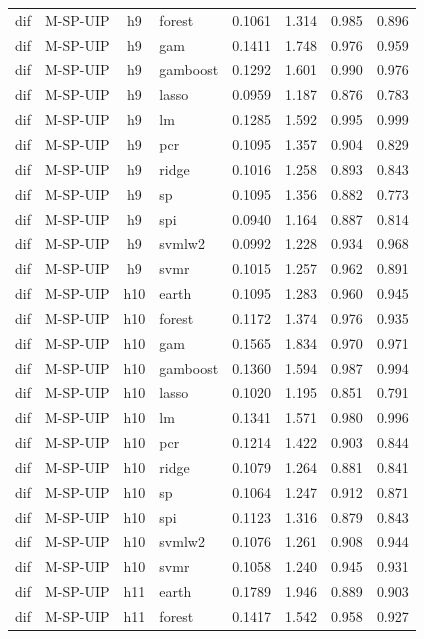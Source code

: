 \begin{ThreePartTable}
\begin{longtable}[t]{llclcccc}
dif & M-SP-UIP & h9 & forest & 0.1061 & 1.314 & 0.985 & 0.896\\
dif & M-SP-UIP & h9 & gam & 0.1411 & 1.748 & 0.976 & 0.959\\
dif & M-SP-UIP & h9 & gamboost & 0.1292 & 1.601 & 0.990 & 0.976\\
dif & M-SP-UIP & h9 & lasso & 0.0959 & 1.187 & 0.876 & 0.783\\
dif & M-SP-UIP & h9 & lm & 0.1285 & 1.592 & 0.995 & 0.999\\
dif & M-SP-UIP & h9 & pcr & 0.1095 & 1.357 & 0.904 & 0.829\\
dif & M-SP-UIP & h9 & ridge & 0.1016 & 1.258 & 0.893 & 0.843\\
dif & M-SP-UIP & h9 & sp & 0.1095 & 1.356 & 0.882 & 0.773\\
dif & M-SP-UIP & h9 & spi & 0.0940 & 1.164 & 0.887 & 0.814\\
dif & M-SP-UIP & h9 & svmlw2 & 0.0992 & 1.228 & 0.934 & 0.968\\
dif & M-SP-UIP & h9 & svmr & 0.1015 & 1.257 & 0.962 & 0.891\\
\addlinespace
dif & M-SP-UIP & h10 & earth & 0.1095 & 1.283 & 0.960 & 0.945\\
dif & M-SP-UIP & h10 & forest & 0.1172 & 1.374 & 0.976 & 0.935\\
dif & M-SP-UIP & h10 & gam & 0.1565 & 1.834 & 0.970 & 0.971\\
dif & M-SP-UIP & h10 & gamboost & 0.1360 & 1.594 & 0.987 & 0.994\\
dif & M-SP-UIP & h10 & lasso & 0.1020 & 1.195 & 0.851 & 0.791\\
dif & M-SP-UIP & h10 & lm & 0.1341 & 1.571 & 0.980 & 0.996\\
dif & M-SP-UIP & h10 & pcr & 0.1214 & 1.422 & 0.903 & 0.844\\
dif & M-SP-UIP & h10 & ridge & 0.1079 & 1.264 & 0.881 & 0.841\\
dif & M-SP-UIP & h10 & sp & 0.1064 & 1.247 & 0.912 & 0.871\\
dif & M-SP-UIP & h10 & spi & 0.1123 & 1.316 & 0.879 & 0.843\\
dif & M-SP-UIP & h10 & svmlw2 & 0.1076 & 1.261 & 0.908 & 0.944\\
dif & M-SP-UIP & h10 & svmr & 0.1058 & 1.240 & 0.945 & 0.931\\
\addlinespace
dif & M-SP-UIP & h11 & earth & 0.1789 & 1.946 & 0.889 & 0.903\\
dif & M-SP-UIP & h11 & forest & 0.1417 & 1.542 & 0.958 & 0.927\\

\end{longtable}
\end{ThreePartTable}
